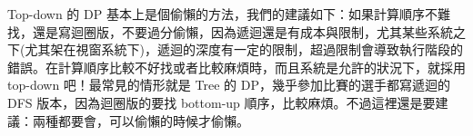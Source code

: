 \documentclass[a4paper, 11pt, oneside]{book}
\begin{document}
Top-down 的 DP 基本上是個偷懶的方法，我們的建議如下：如果計算順序不難找，還是寫迴圈版，不要過分偷懶，因為遞迴還是有成本與限制，尤其某些系統之下(尤其架在視窗系統下)，遞迴的深度有一定的限制，超過限制會導致執行階段的錯誤。在計算順序比較不好找或者比較麻煩時，而且系統是允許的狀況下，就採用 top-down 吧！最常見的情形就是 Tree 的 DP，幾乎參加比賽的選手都寫遞迴的 DFS 版本，因為迴圈版的要找 bottom-up 順序，比較麻煩。不過這裡還是要建議：兩種都要會，可以偷懶的時候才偷懶。
\end{document}
